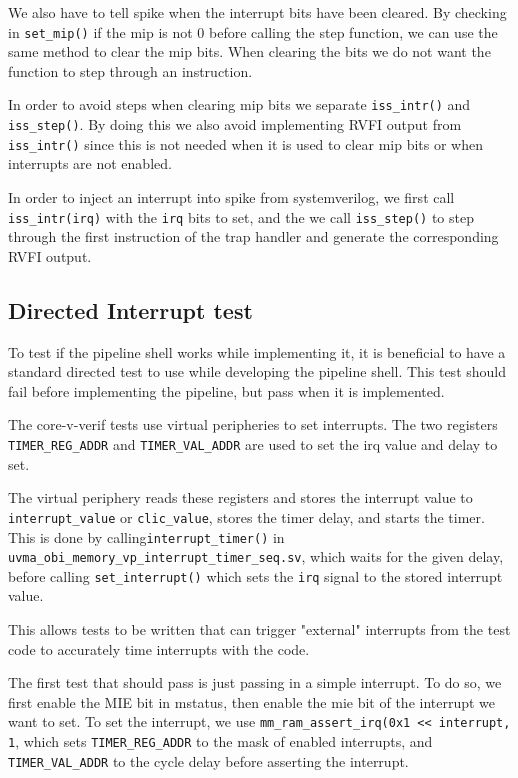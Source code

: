 We also have to tell spike when the interrupt bits have been cleared. By checking in \lstinline{set_mip()} if the mip is not 0 before calling the step function, we can use the same method to clear the mip bits. When clearing the bits we do not want the function to step through an instruction.

In order to avoid steps when clearing mip bits we separate \lstinline{iss_intr()} and \lstinline{iss_step()}. By doing this we also avoid implementing RVFI output from \lstinline{iss_intr()} since this is not needed when it is used to clear mip bits or when interrupts are not enabled. 

In order to inject an interrupt into spike from systemverilog, we first call \lstinline{iss_intr(irq)} with the \lstinline{irq} bits to set, and the we call \lstinline{iss_step()} to step through the first instruction of the trap handler and generate the corresponding RVFI output.


\subsection{Directed Interrupt test}

To test if the pipeline shell works while implementing it, it is beneficial to have a standard directed test to use while developing the pipeline shell.
This test should fail before implementing the pipeline, but pass when it is implemented.

The core-v-verif tests use virtual peripheries to set interrupts. 
The two registers \lstinline{TIMER_REG_ADDR} and \lstinline{TIMER_VAL_ADDR} are used to set the irq value and delay to set.  

The virtual periphery reads these registers and stores the interrupt value to \lstinline{interrupt_value} or \lstinline{clic_value}, stores the timer delay, and starts the timer. This is done by calling\lstinline{interrupt_timer()} in \lstinline{uvma_obi_memory_vp_interrupt_timer_seq.sv}, which waits for the given delay, before calling \lstinline{set_interrupt()} which sets the \lstinline{irq} signal to the stored interrupt value. 

This allows tests to be written that can trigger "external" interrupts from the test code to accurately time interrupts with the code.

The first test that should pass is just passing in a simple interrupt. To do so, we first enable the MIE bit in mstatus, then enable the mie bit of the interrupt we want to set. To set the interrupt, we use \lstinline{mm_ram_assert_irq(0x1 << interrupt, 1}, which sets \lstinline{TIMER_REG_ADDR} to the mask of enabled interrupts, and \lstinline{TIMER_VAL_ADDR} to the cycle delay before asserting the interrupt.

